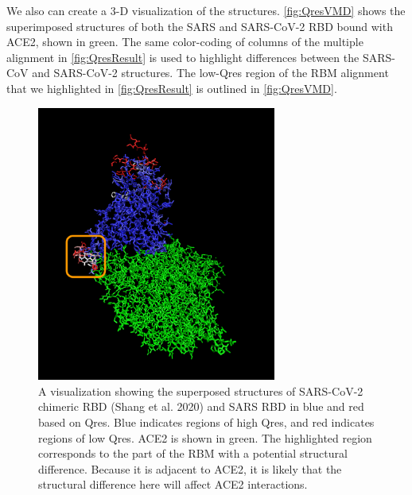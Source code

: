 We also can create a 3-D visualization of the structures. \autoref{fig:QresVMD} shows the superimposed structures of both the SARS and SARS-CoV-2 RBD bound with ACE2, shown in green. The same color-coding of columns of the multiple alignment in \autoref{fig:QresResult} is used to highlight differences between the SARS-CoV and SARS-CoV-2 structures. The low-Qres region of the RBM alignment that we highlighted in \autoref{fig:QresResult} is outlined in \autoref{fig:QresVMD}.

\begin{figure}[h]
	\centering
	\mySfFamily
	\includegraphics[width = 0.7\textwidth]{../images/QresVMD.png}
	\caption{A visualization showing the superposed structures of SARS-CoV-2 chimeric RBD (Shang et al. 2020) and SARS RBD in blue and red based on Qres. Blue indicates regions of high Qres, and red indicates regions of low Qres. ACE2 is shown in green. The highlighted region corresponds to the part of the RBM with a potential structural difference. Because it is adjacent to ACE2, it is likely that the structural difference here will affect ACE2 interactions.}
	\label{fig:QresVMD}
\end{figure}

\begin{note}\end{note}

